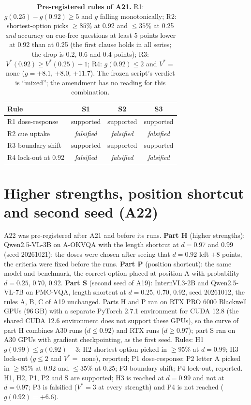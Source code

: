 \begin{table}[tbp]
  \centering
  \footnotesize
  \setlength{\tabcolsep}{3pt}
  \begin{tabular}{@{}lccc@{}}
    \toprule
    Rule & S1 & S2 & S3 \\
    \midrule
    R1 dose-response & supported & supported & supported \\
    R2 cue uptake & \emph{falsified} & \emph{falsified} & \emph{falsified} \\
    R3 boundary shift & supported & supported & supported \\
    R4 lock-out at 0.92 & \emph{falsified} & \emph{falsified} & \emph{falsified} \\
    \bottomrule
  \end{tabular}
  \caption{\textbf{Pre-registered rules of A21.} R1: $g(0.25)-g(0.92)\ge5$ and $g$ falling monotonically; R2: shortest-option picks $\ge85\%$ at 0.92 and $\le35\%$ at 0.25 \emph{and} accuracy on cue-free questions at least 5 points lower at 0.92 than at 0.25 (the first clause holds in all series; the drop is $0.2$, $0.6$ and $0.4$ points); R3: $V^\ast(0.92)\ge V^\ast(0.25)+1$; R4: $g(0.92)\le2$ and $V^\ast=$ none ($g=+8.1$, $+8.0$, $+11.7$). The frozen script's verdict is ``mixed''; the amendment has no reading for this combination.}
  \label{tab:a21rules}
\end{table}

\section{Higher strengths, position shortcut and second seed (A22)}
\label{app:a22}

A22 was pre-registered after A21 and before its runs.
\textbf{Part H} (higher strengths): Qwen2.5-VL-3B on A-OKVQA with the length shortcut at $d=0.97$ and $0.99$ (seed 20261021); the doses were chosen after seeing that $d=0.92$ left $+8$ points, the criteria were fixed before the runs.
\textbf{Part P} (position shortcut): the same model and benchmark, the correct option placed at position A with probability $d=0.25$, 0.70, 0.92.
\textbf{Part S} (second seed of A19): InternVL3-2B and Qwen2.5-VL-7B on PMC-VQA, length shortcut at $d=0.25$, 0.70, 0.92, seed 20261012, the rules A, B, C of A19 unchanged.
Parts H and P ran on RTX PRO 6000 Blackwell GPUs (96\,GB) with a separate PyTorch 2.7.1 environment for CUDA 12.8 (the shared CUDA 12.6 environment does not support these GPUs), so the curve of part H combines A30 runs ($d\le0.92$) and RTX runs ($d\ge0.97$); part S ran on A30 GPUs with gradient checkpointing, as the first seed.
Rules: H1 $g(0.99)\le g(0.92)-3$; H2 shortest option picked in $\ge95\%$ at $d=0.99$; H3 lock-out ($g\le2$ and $V^\ast=$ none), reported; P1 dose-response; P2 letter A picked in $\ge85\%$ at 0.92 and $\le35\%$ at 0.25; P3 boundary shift; P4 lock-out, reported.
H1, H2, P1, P2 and S are supported; H3 is reached at $d=0.99$ and not at $d=0.97$; P3 is falsified ($V^\ast=3$ at every strength) and P4 is not reached ($g(0.92)=+6.6$).

